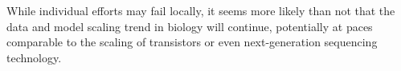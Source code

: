 While individual efforts may fail locally, it seems more likely than not that the data and model scaling trend in biology will continue, potentially at paces comparable to the scaling of transistors or even next-generation sequencing technology. 







